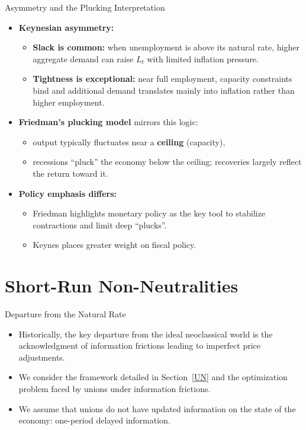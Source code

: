 \documentclass[11pt,aspectratio=169]{beamer}
\begin{document}
\begin{frame}{Asymmetry and the Plucking Interpretation}
\small
\begin{itemize}
  \item \textbf{Keynesian asymmetry:}
  \begin{itemize}
    \item \textbf{Slack is common:} when unemployment is above its natural rate, higher aggregate demand can raise \(L_t\) with limited inflation pressure.
    \item \textbf{Tightness is exceptional:} near full employment, capacity constraints bind and additional demand translates mainly into inflation rather than higher employment.
  \end{itemize}

  \vspace{0.4em}
  \item \textbf{Friedman’s plucking model} \parencite{friedman1964} mirrors this logic:
  \begin{itemize}
    \item output typically fluctuates near a \textbf{ceiling} (capacity),
    \item recessions \enquote{pluck} the economy below the ceiling; recoveries largely reflect the return toward it.
  \end{itemize}

  \vspace{0.4em}
  \item \textbf{Policy emphasis differs:}
  \begin{itemize}
    \item Friedman highlights monetary policy as the key tool to stabilize contractions and limit deep \enquote{plucks}.
    \item Keynes places greater weight on fiscal policy.
  \end{itemize}
\end{itemize}
\end{frame}
\section{Short-Run Non-Neutralities}
\label{SR}

\begin{frame}{Departure from the Natural Rate}
\begin{itemize}
    \item Historically, the key departure from the ideal neoclassical world is the acknowledgment of information frictions leading to imperfect price adjustments. 
    \vspace{1em}
    \item We consider the framework detailed in Section~\ref{UN} and the optimization problem faced by unions under information frictions. 
    \vspace{1em}
    \item We assume that unions do not have updated information on the state of the economy: one-period delayed information. 
\end{itemize}
\end{frame}
\end{document}
